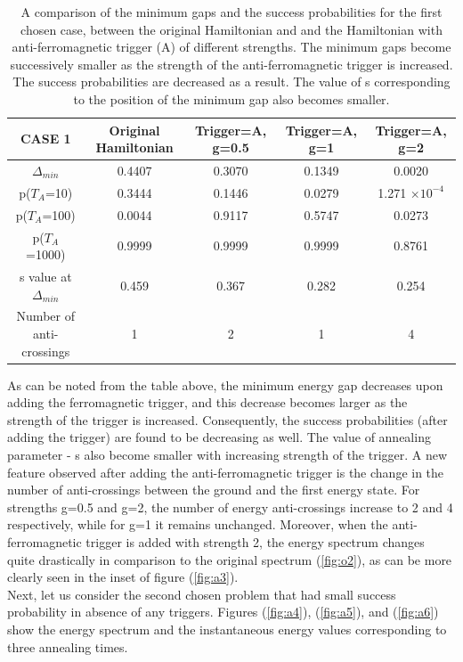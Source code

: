 \documentclass[../main.tex]{subfiles}
\begin{document}
\begin{table}[H]
\centering
\renewcommand{\arraystretch}{1.5}
\begin{tabular}{|c|c|c|c|c|}
\hline 
CASE 1 & Original Hamiltonian & Trigger=A, g=0.5 & Trigger=A, g=1 & Trigger=A, g=2 \\ 
\hline 
$\Delta_{min}$ & 0.4407 & 0.3070 & 0.1349 & 0.0020 \\ 
\hline 
p($T_A$=10) & 0.3444 & 0.1446 & 0.0279 & 1.271 $\times 10^{-4}$ \\ 
\hline 
p($T_A$=100) & 0.0044 & 0.9117 & 0.5747 & 0.0273 \\ 
\hline 
p($T_A$=1000) & 0.9999 & 0.9999 & 0.9999 & 0.8761 \\ 
\hline 
s value at $\Delta_{min}$ & 0.459 & 0.367 & 0.282 & 0.254 \\ 
\hline
Number of anti-crossings & 1 & 2 & 1 & 4 \\
\hline
\end{tabular} 
\caption{A comparison of the minimum gaps and the success probabilities for the first chosen case, between the original Hamiltonian and and the Hamiltonian with anti-ferromagnetic trigger (A) of different strengths. The minimum gaps become successively smaller as the strength of the anti-ferromagnetic trigger is increased. The success probabilities are decreased as a result. The value of s corresponding to the position of the minimum gap also becomes smaller.}
\label{tab:a1}
\end{table}
As can be noted from the table above, the minimum energy gap decreases upon adding the ferromagnetic trigger, and this decrease becomes larger as the strength of the trigger is increased. Consequently, the success probabilities (after adding the trigger) are found to be decreasing as well. The value of annealing parameter - s also become smaller with increasing strength of the trigger.
A new feature observed after adding the anti-ferromagnetic trigger is the change in the number of anti-crossings between the ground and the first energy state. For strengths g=0.5 and g=2, the number of energy anti-crossings increase to 2 and 4 respectively, while for g=1 it remains unchanged. Moreover, when the anti-ferromagnetic trigger is added with strength 2, the energy spectrum changes quite drastically in comparison to the original spectrum (\ref{fig:o2}), as can be more clearly seen in the inset of figure (\ref{fig:a3}).\\

Next, let us consider the second chosen problem that had small success probability in absence of any triggers. Figures (\ref{fig:a4}), (\ref{fig:a5}), and (\ref{fig:a6}) show the energy spectrum and the instantaneous energy values corresponding to three annealing times. 
\end{document}
